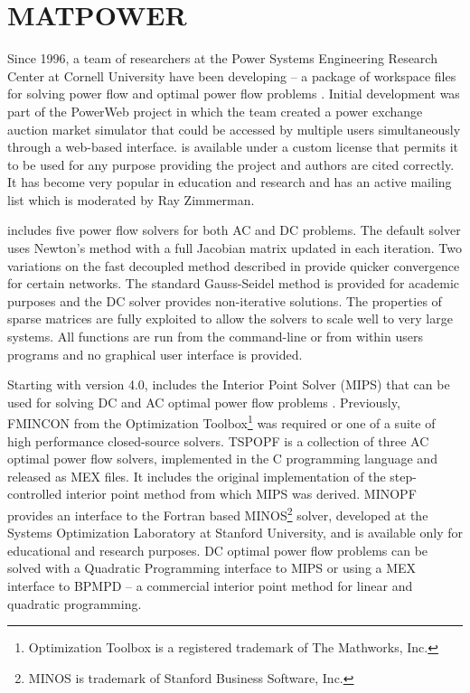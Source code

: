 \section{MATPOWER}
Since 1996, a team of researchers at the Power Systems Engineering Research
Center at Cornell University have been developing \matpower -- a package of
\matlab workspace files for solving power flow and optimal power flow problems
\cite{zimmerman:mp_pes}. Initial development was part of the PowerWeb project
in which the team created a power exchange auction market simulator that could
be accessed by multiple users simultaneously through a web-based interface.
\matpower is available under a custom license that permits it to be used for any
purpose providing the project and authors are cited correctly.  It has become
very popular in education and research and has an active mailing list which is
moderated by Ray Zimmerman.

\matpower includes five power flow solvers for both AC and DC problems.  The
default solver uses Newton's method \cite{tinney:67} with a full Jacobian matrix
updated in each iteration.  Two variations on the fast decoupled method
\cite{stott:74} described in  provide quicker convergence
for certain networks.  The standard Gauss-Seidel method \cite{glimn:57} is provided
for academic purposes and the DC solver provides non-iterative
solutions.  The properties of \matlab sparse matrices are fully exploited to
allow the solvers to scale well to very large systems.  All functions are run
from the \matlab command-line or from within users programs and no graphical
user interface is provided.

Starting with version 4.0, \matpower includes the
\matlab Interior Point Solver (MIPS) that can be used for solving
DC and AC optimal power flow problems \cite{zimmerman:ccv}.  Previously,
FMINCON from the \matlab Optimization Toolbox\footnote{Optimization
Toolbox is a registered trademark of The Mathworks, Inc.} was required or one
of a suite of high performance closed-source solvers.  TSPOPF is a
collection of three AC optimal power flow solvers, implemented in the C
programming language and released as \matlab MEX files.  It includes
the original implementation of the step-controlled interior point method from
which MIPS was derived.  MINOPF provides an interface to the
Fortran based MINOS\footnote{MINOS is trademark of Stanford
Business Software, Inc.} solver, developed at the Systems Optimization
Laboratory at Stanford University, and is available only for educational and
research purposes. DC optimal power flow problems can be solved with
a Quadratic Programming interface to MIPS or using a MEX interface to BPMPD --
a commercial interior point method for linear and quadratic programming.

